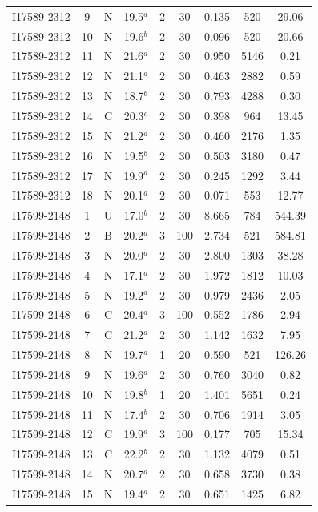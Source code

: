 \begin{table}
\begin{tabular}{ccccccccc}
I17589-2312 & 9 & N & 19.5$^{a}$ & 2 & 30 & 0.135 & 520 & 29.06 \\
I17589-2312 & 10 & N & 19.6$^{b}$ & 2 & 30 & 0.096 & 520 & 20.66 \\
I17589-2312 & 11 & N & 21.6$^{a}$ & 2 & 30 & 0.950 & 5146 & 0.21 \\
I17589-2312 & 12 & N & 21.1$^{a}$ & 2 & 30 & 0.463 & 2882 & 0.59 \\
I17589-2312 & 13 & N & 18.7$^{b}$ & 2 & 30 & 0.793 & 4288 & 0.30 \\
I17589-2312 & 14 & C & 20.3$^{c}$ & 2 & 30 & 0.398 & 964 & 13.45 \\
I17589-2312 & 15 & N & 21.2$^{a}$ & 2 & 30 & 0.460 & 2176 & 1.35 \\
I17589-2312 & 16 & N & 19.5$^{b}$ & 2 & 30 & 0.503 & 3180 & 0.47 \\
I17589-2312 & 17 & N & 19.9$^{a}$ & 2 & 30 & 0.245 & 1292 & 3.44 \\
I17589-2312 & 18 & N & 20.1$^{a}$ & 2 & 30 & 0.071 & 553 & 12.77 \\
I17599-2148 & 1 & U & 17.0$^{b}$ & 2 & 30 & 8.665 & 784 & 544.39 \\
I17599-2148 & 2 & B & 20.2$^{a}$ & 3 & 100 & 2.734 & 521 & 584.81 \\
I17599-2148 & 3 & N & 20.0$^{a}$ & 2 & 30 & 2.800 & 1303 & 38.28 \\
I17599-2148 & 4 & N & 17.1$^{a}$ & 2 & 30 & 1.972 & 1812 & 10.03 \\
I17599-2148 & 5 & N & 19.2$^{a}$ & 2 & 30 & 0.979 & 2436 & 2.05 \\
I17599-2148 & 6 & C & 20.4$^{a}$ & 3 & 100 & 0.552 & 1786 & 2.94 \\
I17599-2148 & 7 & C & 21.2$^{a}$ & 2 & 30 & 1.142 & 1632 & 7.95 \\
I17599-2148 & 8 & N & 19.7$^{a}$ & 1 & 20 & 0.590 & 521 & 126.26 \\
I17599-2148 & 9 & N & 19.6$^{a}$ & 2 & 30 & 0.760 & 3040 & 0.82 \\
I17599-2148 & 10 & N & 19.8$^{b}$ & 1 & 20 & 1.401 & 5651 & 0.24 \\
I17599-2148 & 11 & N & 17.4$^{b}$ & 2 & 30 & 0.706 & 1914 & 3.05 \\
I17599-2148 & 12 & C & 19.9$^{a}$ & 3 & 100 & 0.177 & 705 & 15.34 \\
I17599-2148 & 13 & C & 22.2$^{b}$ & 2 & 30 & 1.132 & 4079 & 0.51 \\
I17599-2148 & 14 & N & 20.7$^{a}$ & 2 & 30 & 0.658 & 3730 & 0.38 \\
I17599-2148 & 15 & N & 19.4$^{a}$ & 2 & 30 & 0.651 & 1425 & 6.82 \\

\end{tabular}
\end{table}
